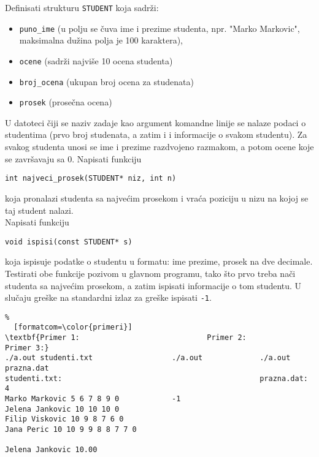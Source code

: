 \documentclass{article}
\begin{document}
\begin{z}
Definisati strukturu \verb|STUDENT| koja sadr\v zi:
\begin{itemize}
\item \verb|puno_ime| (u polju se \v cuva ime i prezime studenta,
  npr. "Marko Markovic", maksimalna du\v zina polja je 100
  karaktera),
\item \verb|ocene| (sadr\v zi najvi\v se 10 ocena studenta)
\item \verb|broj_ocena| (ukupan broj ocena za studenata)
\item \verb|prosek| (prose\v cna ocena)
\end{itemize}
U datoteci čiji se naziv zadaje kao argument komandne linije
se nalaze podaci o studentima (prvo broj studenata, a zatim i i
informacije o svakom studentu). Za svakog studenta unosi se
ime i prezime razdvojeno razmakom, a potom ocene koje se zavr\v savaju sa
0. Napisati funkciju
\begin{center}{\tt int najveci\_prosek(STUDENT* niz, int n)} \end{center}
koja pronalazi studenta sa najvećim prosekom i vraća poziciju u nizu na kojoj se taj student nalazi. \\
Napisati funkciju
\begin{center}{\tt void ispisi(const STUDENT* s)} \end{center}
koja ispisuje podatke o studentu u formatu: ime prezime, prosek na dve decimale.
Testirati obe funkcije pozivom u glavnom programu, tako što prvo treba nači studenta
sa najvećim prosekom, a zatim ispisati informacije o tom studentu.
U slučaju greške na standardni izlaz za greške ispisati {\tt -1}. 
\begin{Verbatim}%
  [formatcom=\color{primeri}]
\textbf{Primer 1:                             Primer 2:           Primer 3:}
./a.out studenti.txt                  ./a.out             ./a.out prazna.dat
studenti.txt:                                             prazna.dat:
4
Marko Markovic 5 6 7 8 9 0            -1
Jelena Jankovic 10 10 10 0
Filip Viskovic 10 9 8 7 6 0
Jana Peric 10 10 9 9 8 8 7 7 0

Jelena Jankovic 10.00
\end{Verbatim}
\end{z}

\newpage
\end{document}
